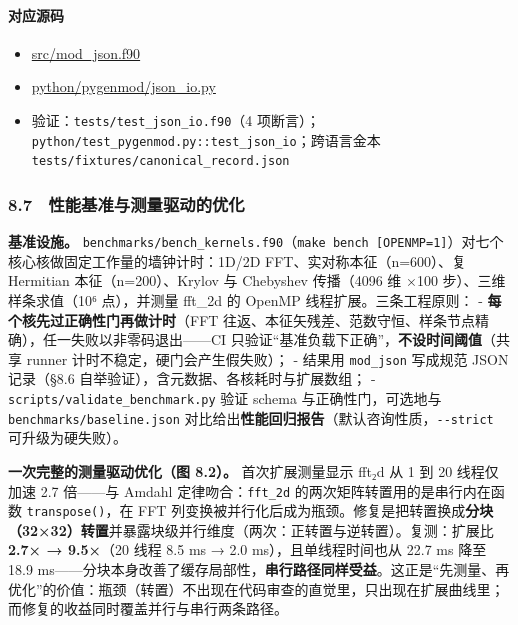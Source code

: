 \documentclass[
]{ctexbook}
\providecommand{\tightlist}{%
  \setlength{\itemsep}{0pt}\setlength{\parskip}{0pt}}
\begin{document}
\hypertarget{ux5bf9ux5e94ux6e90ux7801-37}{%
\paragraph{对应源码}\label{ux5bf9ux5e94ux6e90ux7801-37}}

\begin{itemize}
\tightlist
\item
  \href{https://github.com/l1Ha/QuantumGeneralModule/blob/main/src/mod_json.f90}{src/mod\_json.f90}
\item
  \href{https://github.com/l1Ha/QuantumGeneralModule/blob/main/python/pygenmod/json_io.py}{python/pygenmod/json\_io.py}
\item
  验证：\texttt{tests/test\_json\_io.f90}（4
  项断言）；\texttt{python/test\_pygenmod.py::test\_json\_io}；跨语言金本
  \texttt{tests/fixtures/canonical\_record.json}
\end{itemize}

\hypertarget{ux6027ux80fdux57faux51c6ux4e0eux6d4bux91cfux9a71ux52a8ux7684ux4f18ux5316}{%
\subsubsection{8.7　性能基准与测量驱动的优化}\label{ux6027ux80fdux57faux51c6ux4e0eux6d4bux91cfux9a71ux52a8ux7684ux4f18ux5316}}

\textbf{基准设施。}
\texttt{benchmarks/bench\_kernels.f90}（\texttt{make\ bench\ {[}OPENMP=1{]}}）对七个核心核做固定工作量的墙钟计时：1D/2D
FFT、实对称本征（n=600）、复 Hermitian 本征（n=200）、Krylov 与
Chebyshev 传播（4096 维 ×100 步）、三维样条求值（10⁶ 点），并测量
fft\_2d 的 OpenMP 线程扩展。三条工程原则： -
\textbf{每个核先过正确性门再做计时}（FFT
往返、本征矢残差、范数守恒、样条节点精确），任一失败以非零码退出------CI
只验证``基准负载下正确''，\textbf{不设时间阈值}（共享 runner
计时不稳定，硬门会产生假失败）； - 结果用 \texttt{mod\_json} 写成规范
JSON 记录（§8.6 自举验证），含元数据、各核耗时与扩展数组； -
\texttt{scripts/validate\_benchmark.py} 验证 schema 与正确性门，可选地与
\texttt{benchmarks/baseline.json}
对比给出\textbf{性能回归报告}（默认咨询性质，\texttt{-\/-strict}
可升级为硬失败）。

\textbf{一次完整的测量驱动优化（图 8.2）。} 首次扩展测量显示 fft₂d 从 1
到 20 线程仅加速 2.7 倍------与 Amdahl 定律吻合：\texttt{fft\_2d}
的两次矩阵转置用的是串行内在函数 \texttt{transpose()}，在 FFT
列变换被并行化后成为瓶颈。修复是把转置换成\textbf{分块（32×32）转置}并暴露块级并行维度（两次：正转置与逆转置）。复测：扩展比
\textbf{2.7× → 9.5×}（20 线程 8.5 ms → 2.0 ms），且单线程时间也从 22.7
ms 降至 18.9
ms------分块本身改善了缓存局部性，\textbf{串行路径同样受益}。这正是``先测量、再优化''的价值：瓶颈（转置）不出现在代码审查的直觉里，只出现在扩展曲线里；而修复的收益同时覆盖并行与串行两条路径。
\end{document}
